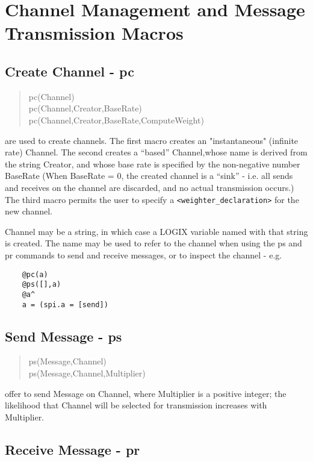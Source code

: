 \section{Channel Management and Message Transmission Macros}

\subsection{Create Channel - pc}

\begin{verse}
pc(Channel) \\
pc(Channel,Creator,BaseRate)
pc(Channel,Creator,BaseRate,ComputeWeight)
\end{verse}

\noindent
are used to create channels.  The first macro creates an "instantaneous"
(infinite rate) Channel.  The second creates a ``based'' Channel,whose
name is derived from the string Creator, and whose base rate is specified by
the non-negative number BaseRate (When BaseRate = 0, the created
channel is a ``sink'' -
i.e. all sends and receives on the channel are discarded, and no actual
transmission occurs.)  The third macro permits the user to specify a
\verb+<weighter_declaration>+ for the new channel.

\noindent
Channel may be a string, in which case a LOGIX variable named with that
string is created.  The name may be used to refer to the channel
when using the ps and pr commands to send and receive messages, or
to inspect the channel - e.g.
\begin{verbatim}
    @pc(a)
    @ps([],a)
    @a^
    a = (spi.a = [send])
\end{verbatim}

\subsection{Send Message - ps}

\begin{verse}
ps(Message,Channel) \\
ps(Message,Channel,Multiplier)
\end{verse}

\noindent
offer to send Message on Channel, where Multiplier is a positive integer;
the likelihood that Channel will be selected for transmission
increases with Multiplier.

\subsection{Receive Message - pr}

